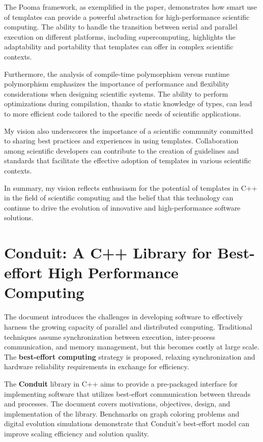 \documentclass[11pt]{article}
\begin{document}
\begin{multicols*}{2}[\columnsep=1cm]
        The Pooma framework, as exemplified in the paper, demonstrates how smart use of templates can provide a powerful abstraction for high-performance scientific computing. The ability to handle the transition between serial and parallel execution on different platforms, including supercomputing, highlights the adaptability and portability that templates can offer in complex scientific contexts.
        
        Furthermore, the analysis of compile-time polymorphism versus runtime polymorphism emphasizes the importance of performance and flexibility considerations when designing scientific systems. The ability to perform optimizations during compilation, thanks to static knowledge of types, can lead to more efficient code tailored to the specific needs of scientific applications.
        
        My vision also underscores the importance of a scientific community committed to sharing best practices and experiences in using templates. Collaboration among scientific developers can contribute to the creation of guidelines and standards that facilitate the effective adoption of templates in various scientific contexts.

        In summary, my vision reflects enthusiasm for the potential of templates in C++ in the field of scientific computing and the belief that this technology can continue to drive the evolution of innovative and high-performance software solutions.

\section{Conduit: A C++ Library for Best-effort High Performance Computing}
    The document introduces the challenges in developing software to effectively harness the growing capacity of parallel and distributed computing. Traditional techniques assume synchronization between execution, inter-process communication, and memory management, but this becomes costly at large scale. The \textbf{best-effort computing} strategy is proposed, relaxing synchronization and hardware reliability requirements in exchange for efficiency.
    
    The \textbf{Conduit} library in C++ aims to provide a pre-packaged interface for implementing software that utilizes best-effort communication between threads and processes. The document covers motivations, objectives, design, and implementation of the library. Benchmarks on graph coloring problems and digital evolution simulations demonstrate that Conduit's best-effort model can improve scaling efficiency and solution quality.
    

\end{multicols*}
\end{document}
